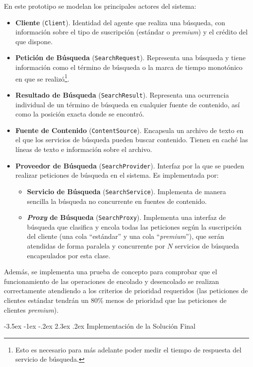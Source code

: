 \documentclass[a4paper]{article}
\makeatletter
\renewcommand\section{\@startsection {section}{1}{\z@}%
	{-3.5ex \@plus -1ex \@minus -.2ex}%
	{2.3ex \@plus.2ex}%
	{\normalfont\large\scshape}}
\makeatother
\begin{document}
	En este prototipo se modelan los principales actores del sistema:
	\begin{itemize}
		\item \textbf{Cliente} (\texttt{Client}). Identidad del agente que realiza una búsqueda, con información sobre el tipo de suscripción (estándar o \textit{premium}) y el crédito del que dispone.
		\item \textbf{Petición de Búsqueda} (\texttt{SearchRequest}). Representa una búsqueda y tiene información como el término de búsqueda o la marca de tiempo monotónico en que se realizó\footnote{Esto es necesario para más adelante poder medir el tiempo de respuesta del servicio de búsqueda.}.
		\item \textbf{Resultado de Búsqueda} (\texttt{SearchResult}). Representa una ocurrencia individual de un término de búsqueda en cualquier fuente de contenido, así como la posición exacta donde se encontró.
		\item \textbf{Fuente de Contenido} (\texttt{ContentSource}). Encapsula un archivo de texto en el que los servicios de búsqueda pueden buscar contenido. Tienen en caché las líneas de texto e información sobre el archivo.
		\item \textbf{Proveedor de Búsqueda} (\texttt{SearchProvider}). Interfaz por la que se pueden realizar peticiones de búsqueda en el sistema. Es implementada por: \begin{itemize}
			\item \textbf{Servicio de Búsqueda} (\texttt{SearchService}). Implementa de manera sencilla la búsqueda no concurrente en fuentes de contenido.
			\item \textbf{\textit{Proxy} de Búsqueda} (\texttt{SearchProxy}). Implementa una interfaz de búsqueda que clasifica y encola todas las peticiones según la suscripción del cliente (una cola ``estándar'' y una cola ``\textit{premium}''), que serán atendidas de forma paralela y concurrente por $N$ servicios de búsqueda encapsulados por esta clase.
		\end{itemize}
	\end{itemize}
	
	Además, se implementa una prueba de concepto para comprobar que el funcionamiento de las operaciones de encolado y desencolado se realizan correctamente atendiendo a los criterios de prioridad requeridos (las peticiones de clientes estándar tendrán un 80\% menos de prioridad que las peticiones de clientes \textit{premium}).
	
	\section{Implementación de la Solución Final}
	
\end{document}
